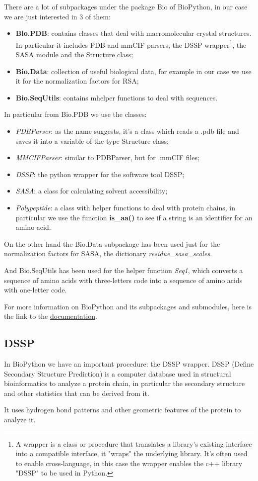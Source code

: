 There are a lot of subpackages under the package Bio of BioPython, in our case we are just interested in 3 of them:
\begin{itemize}
    \item \textbf{Bio.PDB}: contains classes that deal with macromolecular crystal structures. In particular it includes PDB and mmCIF parsers, the DSSP wrapper\footnote{A wrapper is a class or procedure that translates a library's existing interface into a compatible interface, it "wraps" the underlying library. It's often used to enable cross-language, in this case the wrapper enables the c++ library "DSSP" to be used in Python.}, the SASA module and the Structure class;
    \item \textbf{Bio.Data}: collection of useful biological data, for example in our case we use it for the normalization factors for RSA;
    \item \textbf{Bio.SeqUtils}: contains mhelper functions to deal with sequences.
\end{itemize}

In particular from Bio.PDB we use the classes:
\begin{itemize}
    \item \textit{PDBParser}: as the name suggests, it's a class which reads a .pdb file and saves it into a variable of the type Structure class;
    \item \textit{MMCIFParser}: similar to PDBParser, but for .mmCIF files;
    \item \textit{DSSP}: the python wrapper for the software tool DSSP;
    \item \textit{SASA}: a class for calculating solvent accessibility;
    \item \textit{Polypeptide}: a class with helper functions to deal with protein chains, in particular we use the function \textbf{is\_aa()} to see if a string is an identifier for an amino acid.
\end{itemize}

On the other hand the Bio.Data subpackage has been used just for the normalization factors for SASA, the dictionary \textit{residue\_sasa\_scales}. 

And Bio.SeqUtils has been used for the helper function \textit{Seq1}, which converts a sequence of amino acids with three-letters code into a sequence of amino acids with one-letter code.

For more information on BioPython and its subpackages and submodules, here is the link to the  \underline{\href{https://biopython.org/docs/dev/api/index.html}{documentation}}.

\subsection{DSSP}

In BioPython we have an important procedure: the DSSP wrapper. DSSP (Define Secondary Structure Prediction) is a computer database used in structural bioinformatics to analyze a protein chain, in particular the secondary structure and other statistics that can be derived from it.

It uses hydrogen bond patterns and other geometric features of the protein to analyze it.